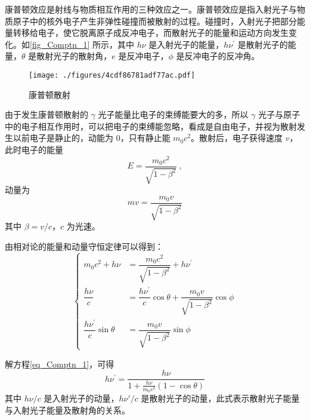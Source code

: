 
\begin{issues}
\issueMissDepend
\end{issues}

康普顿效应是射线与物质相互作用的三种效应之一。康普顿效应是指入射光子与物质原子中的核外电子产生非弹性碰撞而被散射的过程。碰撞时，入射光子把部分能量转移给电子，使它脱离原子成反冲电子，而散射光子的能量和运动方向发生变化。如\autoref{fig_Comptn_1} 所示，其中 $h\nu$ 是入射光子的能量，$h\nu^\prime$ 是散射光子的能量，$\theta$ 是散射光子的散射角，$e$ 是反冲电子，$\phi$ 是反冲电子的反冲角。
\begin{figure}[ht]
\centering
\texttt{[image: ./figures/4cdf86781adf77ac.pdf]}
\caption{康普顿散射} \label{fig_Comptn_1}
\end{figure}
由于发生康普顿散射的 $\gamma$ 光子能量比电子的束缚能要大的多，所以 $\gamma$ 光子与原子中的电子相互作用时，可以把电子的束缚能忽略，看成是自由电子，并视为散射发生以前电子是静止的，动能为 $0$，只有静止能 $m_0c^2$。散射后，电子获得速度 $v$，此时电子的能量
\begin{equation}
E=\frac{m_{0} c^{2}}{\sqrt{1-\beta^{2}}}~,
\end{equation}
动量为
\begin{equation}
m v=\frac{m_{0} v}{\sqrt{1-\beta^{2}}}
\end{equation}
其中 $\beta=v/c$，$c$ 为光速。

由相对论的能量和动量守恒定律可以得到：
\begin{equation} \label{eq_Comptn_1}
\begin{cases}
m_{0} c^{2}+h \nu&=\dfrac{m_{0} c^{2}}{\sqrt{1-\beta^{2}}}+h \nu^{\prime} \\
\dfrac{h \nu}{c}&=\dfrac{h \nu^{\prime}}{c} \cos \theta+\dfrac{m_{0} v}{\sqrt{1-\beta^{2}}} \cos \phi \\
\dfrac{h \nu^{\prime}}{c} \sin \theta&=\dfrac{m_{0} v}{\sqrt{1-\beta^{2}}} \sin \phi
\end{cases}
\end{equation}

解方程\autoref{eq_Comptn_1}，可得
\begin{equation}
h \nu^{\prime}=\frac{h \nu}{1+\frac{h \nu}{m_{0} c^{2}}(1-\cos \theta)}
\end{equation}
其中 $h\nu / c$ 是入射光子的动量，$h\nu' / c$ 是散射光子的动量，此式表示散射光子能量与入射光子能量及散射角的关系。